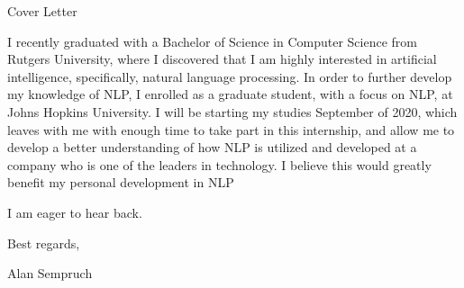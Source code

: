 \documentclass[letterpaper]{article}
\begin{document}
{\huge Cover Letter}
\vspace{0.25in}

I recently graduated with a Bachelor of Science in Computer Science from Rutgers University, where I discovered that I am highly interested in artificial intelligence, specifically, natural language processing. In order to further develop my knowledge of NLP, I enrolled as a graduate student, with a focus on NLP, at Johns Hopkins University. I will be starting my studies September of 2020, which leaves with me with enough time to take part in this internship, and allow me to develop a better understanding of how NLP is utilized and developed at a company who is one of the leaders in technology. I believe this would greatly benefit my personal development in NLP

I am eager to hear back.

\bigskip

Best regards,

Alan Sempruch

    
\end{document}
